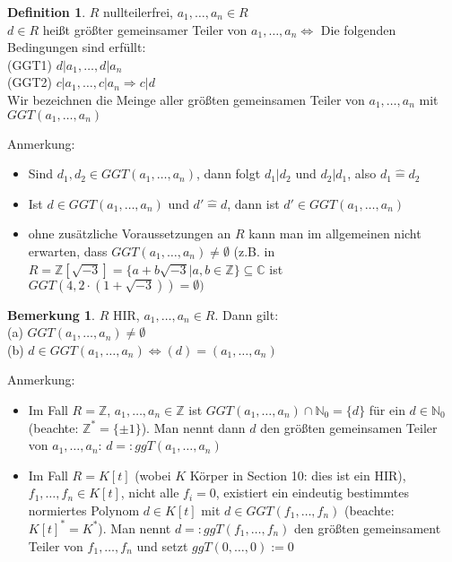 \documentclass[10pt,a4paper,numbers=endperiod]{scrartcl}
\theoremstyle{definition}
\newtheorem{defi}[satz]{Definition}
\newtheorem{bem}[satz]{Bemerkung}
\def\CC{{\mathbb C}}
\def\NN{{\mathbb N}}
\def\ZZ{{\mathbb Z}}
\begin{document}
\begin{defi}
	$R$ nullteilerfrei, $a_1, \ldots, a_n \in R$\\
	$d \in R$ heißt größter gemeinsamer Teiler von $a_1, \ldots, a_n \Leftrightarrow$ Die folgenden Bedingungen sind erfüllt:\\
	(GGT1) $d|a_1, \ldots, d|a_n$\\
	(GGT2) $c|a_1, \ldots, c|a_n \Rightarrow c|d$\\
	Wir bezeichnen die Meinge aller größten gemeinsamen Teiler von $a_1, \ldots, a_n$ mit $GGT(a_1, \ldots, a_n)$
\end{defi}

Anmerkung:
\begin{itemize}
	\item Sind $d_1, d_2 \in GGT(a_1, \ldots, a_n)$, dann folgt $d_1|d_2$ und $d_2|d_1$, also $d_1 \widehat{=} d_2$
	\item Ist $d \in GGT(a_1, \ldots, a_n)$ und $d' \widehat{=} d$, dann ist $d' \in GGT(a_1, \ldots, a_n)$
	\item ohne zusätzliche Voraussetzungen an $R$ kann man im allgemeinen nicht erwarten, dass $GGT(a_1, \ldots, a_n) \neq \emptyset$ (z.B. in $R = \ZZ[\sqrt{-3}] = \{a + b\sqrt{-3}|a,b \in \ZZ\} \subseteq \CC$ ist $GGT(4, 2 \cdot (1+ \sqrt{-3})) = \emptyset)$
\end{itemize}

\begin{bem}
	$R$ HIR, $a_1, \ldots, a_n \in R$. Dann gilt:\\
	(a) $GGT(a_1, \ldots, a_n) \neq \emptyset$\\
	(b) $d \in GGT(a_1, \ldots, a_n) \Leftrightarrow (d) = (a_1, \ldots, a_n)$
\end{bem}

Anmerkung: \begin{itemize}
	\item Im Fall $R = \ZZ$, $a_1, \ldots, a_n \in \ZZ$ ist $GGT(a_1, \ldots, a_n) \cap \NN_0 = \{d\}$ für ein $d \in \NN_0$ (beachte: $\ZZ^* = \{ \pm 1\}$). Man nennt dann $d$ den größten gemeinsamen Teiler von $a_1, \ldots, a_n$: $d =: ggT(a_1, \ldots, a_n)$ 
	\item Im Fall $R = K[t]$ (wobei $K$ Körper in Section 10: dies ist ein HIR), $f_1, \ldots, f_n \in K[t]$, nicht alle $f_i = 0$, existiert ein eindeutig bestimmtes normiertes Polynom $d \in K[t]$ mit $d \in GGT(f_1, \ldots, f_n)$ (beachte: $K[t]^* = K^*$). Man nennt $d =: ggT(f_1, \ldots, f_n)$ den größten gemeinsament Teiler von $f_1, \ldots, f_n$ und setzt $ggT(0, \ldots, 0) := 0$ 
\end{itemize}
\end{document}
